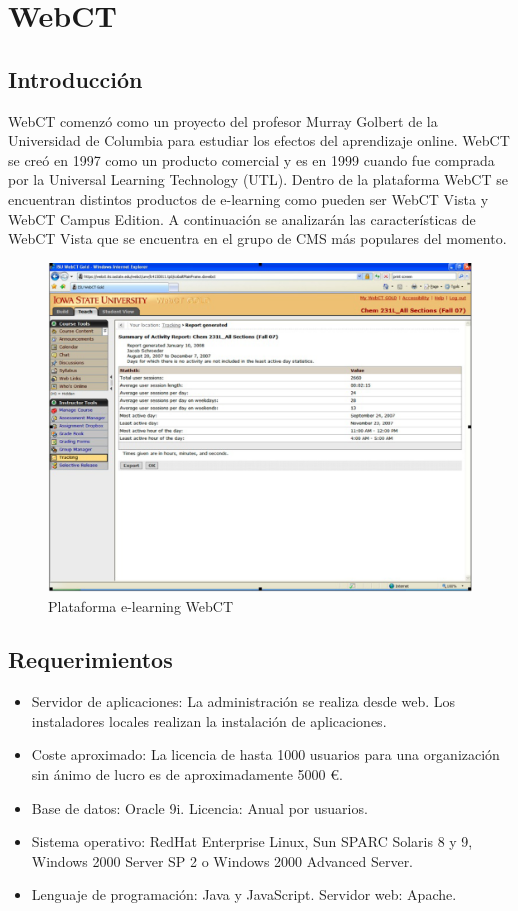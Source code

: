 \section{WebCT}

\subsection{Introducción}

WebCT \cite{webct} comenzó como un proyecto del profesor Murray Golbert de la Universidad de Columbia para estudiar los efectos del aprendizaje online. WebCT se creó en 1997 como un producto comercial y es en 1999 cuando fue comprada por la Universal Learning Technology (UTL). Dentro de la plataforma WebCT se encuentran distintos productos de e-learning como pueden ser WebCT Vista y WebCT Campus Edition. A continuación se analizarán las características de WebCT Vista que se encuentra en el grupo de CMS más populares del momento.

\begin{figure}[h]
	\includegraphics[width=\textwidth]{./img/c2-webct.eps}
	\caption{Plataforma e-learning WebCT}
\end{figure}

\subsection{Requerimientos}

\begin{itemize}
	\item Servidor de aplicaciones: La administración se realiza desde web. Los instaladores locales realizan la instalación de aplicaciones.
	\item Coste aproximado: La licencia de hasta 1000 usuarios para una organización sin ánimo de lucro es de aproximadamente 5000 €.
	\item Base de datos: Oracle 9i. Licencia: Anual por usuarios.
	\item Sistema operativo: RedHat Enterprise Linux, Sun SPARC Solaris 8 y 9, Windows 2000 Server SP 2 o Windows 2000 Advanced Server.
	\item Lenguaje de programación: Java y JavaScript. Servidor web: Apache.
\end{itemize}


